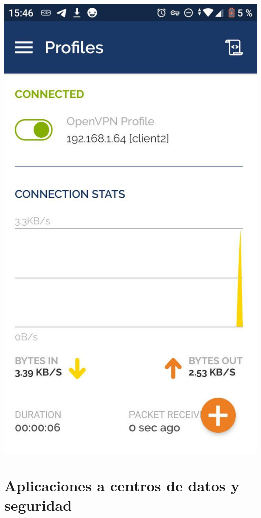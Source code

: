\documentclass[11pt,a4paper]{article}
\begin{document}
\begin{center}
\includegraphics[scale=0.4]{connected.jpg}
\end{center}

\newpage

\section{Aplicaciones a centros de datos y seguridad}
\end{document}
